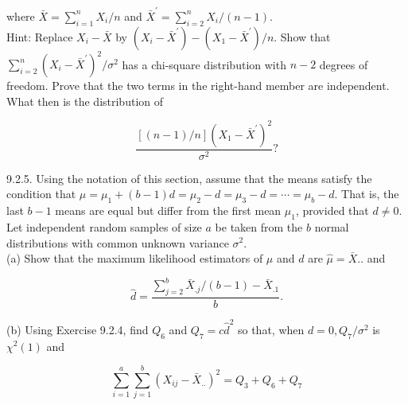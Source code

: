 where $\bar{X}=\sum_{i=1}^{n} X_{i} / n$ and $\bar{X}^{\prime}=\sum_{i=2}^{n} X_{i} /(n-1)$.\\
Hint: Replace $X_{i}-\bar{X}$ by $\left(X_{i}-\bar{X}^{\prime}\right)-\left(X_{1}-\bar{X}^{\prime}\right) / n$. Show that $\sum_{i=2}^{n}\left(X_{i}-\bar{X}^{\prime}\right)^{2} / \sigma^{2}$ has a chi-square distribution with $n-2$ degrees of freedom. Prove that the two terms in the right-hand member are independent. What then is the distribution of

$$
\frac{[(n-1) / n]\left(X_{1}-\bar{X}^{\prime}\right)^{2}}{\sigma^{2}} ?
$$

9.2.5. Using the notation of this section, assume that the means satisfy the condition that $\mu=\mu_{1}+(b-1) d=\mu_{2}-d=\mu_{3}-d=\cdots=\mu_{b}-d$. That is, the last $b-1$ means are equal but differ from the first mean $\mu_{1}$, provided that $d \neq 0$. Let independent random samples of size $a$ be taken from the $b$ normal distributions with common unknown variance $\sigma^{2}$.\\
(a) Show that the maximum likelihood estimators of $\mu$ and $d$ are $\hat{\mu}=\bar{X}$.. and

$$
\hat{d}=\frac{\sum_{j=2}^{b} \bar{X}_{. j} /(b-1)-\bar{X}_{.1}}{b} .
$$

(b) Using Exercise 9.2.4, find $Q_{6}$ and $Q_{7}=c \hat{d}^{2}$ so that, when $d=0, Q_{7} / \sigma^{2}$ is $\chi^{2}(1)$ and

$$
\sum_{i=1}^{a} \sum_{j=1}^{b}\left(X_{i j}-\bar{X}_{. .}\right)^{2}=Q_{3}+Q_{6}+Q_{7}
$$


